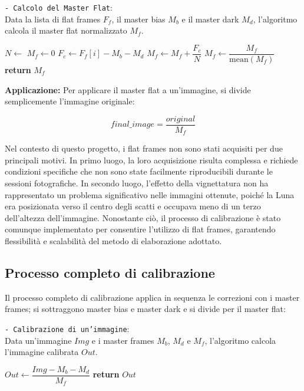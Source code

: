 \begin{algorithm}[H]
    \caption{\texttt{- Calcolo del Master Flat}:\\ Data la lista di flat frames $F_f$, il master bias $M_b$ e il master dark $M_d$, l'algoritmo calcola il master flat normalizzato $M_f$.} \label{alg:flat}
    \begin{algorithmic}[1]
            \State $N \gets$ 
            \State $M_f \gets 0$
                \State $F_c \gets F_f[i] - M_b - M_d$ 
                \State $M_f \gets M_f + \dfrac {F_c} N$ 
            \EndFor
            \State $M_f \gets \dfrac {M_f} {\text{mean}(M_f)}$ 
            \State \textbf{return} $M_f$
        \EndFunction
    \end{algorithmic}
\end{algorithm}

\textbf{Applicazione:} Per applicare il master flat a un'immagine, si divide semplicemente l'immagine originale:

$$
    final\_image = \dfrac {original} {M_f}
$$

Nel contesto di questo progetto, i flat frames non sono stati acquisiti per due principali motivi. In primo luogo, la loro acquisizione risulta complessa e richiede condizioni specifiche che non sono state facilmente riproducibili durante le sessioni fotografiche. In secondo luogo, l'effetto della vignettatura non ha rappresentato un problema significativo nelle immagini ottenute, poiché la Luna era posizionata verso il centro degli scatti e occupava meno di un terzo dell'altezza dell'immagine. Nonostante ciò, il processo di calibrazione è stato comunque implementato per consentire l'utilizzo di flat frames, garantendo flessibilità e scalabilità del metodo di elaborazione adottato.

\subsection{Processo completo di calibrazione} \label{subsec:calibration_process}

Il processo completo di calibrazione applica in sequenza le correzioni con i master frames; si sottraggono master bias e master dark e si divide per il master flat:

\begin{algorithm}[H]
    \caption{\texttt{- Calibrazione di un'immagine}:\\ Data un'immagine $Img$ e i master frames $M_b$, $M_d$ e $M_f$, l'algoritmo calcola l'immagine calibrata $Out$.} \label{alg:calibration}
    \begin{algorithmic}[1]
            \State $Out \gets \dfrac {Img - M_b - M_d} {M_f}$
            \State \textbf{return} $Out$
        \EndFunction
    \end{algorithmic}
\end{algorithm}

